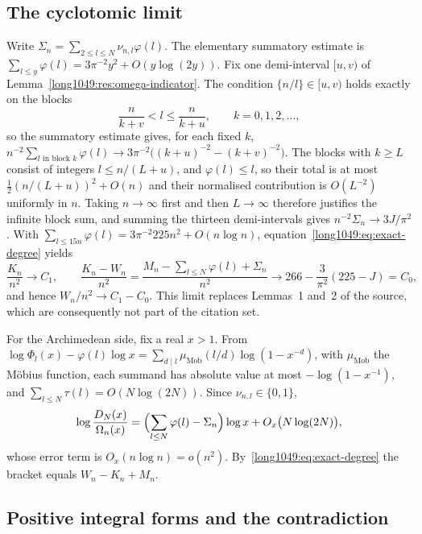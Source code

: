 \documentclass[11pt]{article}
\begin{document}
\subsection{The cyclotomic limit}\label{long1049:sec:cyclotomic-limit}

Write $\Sigma_n=\sum_{2\le l\le N}\nu_{n,l}\varphi(l)$.  The elementary
summatory estimate is $\sum_{l\le y}\varphi(l)=3\pi^{-2}y^{2}+O(y\log(2y))$.
Fix one demi-interval $[u,v)$ of Lemma~\ref{long1049:res:omega-indicator}.  The condition
$\{n/l\}\in[u,v)$ holds exactly on the blocks
\[
 \frac{n}{k+v}<l\le\frac{n}{k+u},\qquad k=0,1,2,\dots,
\]
so the summatory estimate gives, for each fixed $k$,
$n^{-2}\sum_{l\text{ in block }k}\varphi(l)\to3\pi^{-2}\bigl((k+u)^{-2}-(k+v)^{-2}\bigr)$.
The blocks with $k\ge L$ consist of integers $l\le n/(L+u)$, and
$\varphi(l)\le l$, so their total is at most $\tfrac12(n/(L+u))^{2}+O(n)$ and
their normalised contribution is $O(L^{-2})$ uniformly in $n$.  Taking
$n\to\infty$ first and then $L\to\infty$ therefore justifies the infinite block
sum, and summing the thirteen demi-intervals gives
$n^{-2}\Sigma_n\to3J/\pi^{2}$.  With $\sum_{l\le15n}\varphi(l)=3\pi^{-2}225n^{2}+O(n\log n)$,
equation~\eqref{long1049:eq:exact-degree} yields
\begin{equation}\label{long1049:eq:degree-limits}
 \frac{K_n}{n^{2}}\to C_1,
 \qquad
 \frac{K_n-W_n}{n^{2}}=\frac{M_n-\sum_{l\le N}\varphi(l)+\Sigma_n}{n^{2}}
 \to266-\frac{3}{\pi^{2}}(225-J)=C_0,
\end{equation}
and hence $W_n/n^{2}\to C_1-C_0$.  This limit replaces Lemmas~1 and~2 of the
source, which are consequently not part of the citation set.

For the Archimedean side, fix a real $x>1$.  From
$\log\Phi_l(x)-\varphi(l)\log x=\sum_{d\mid l}\mu_{\mathrm{Mob}}(l/d)\log(1-x^{-d})$,
with $\mu_{\mathrm{Mob}}$ the M\"obius function, each summand has absolute value
at most $-\log(1-x^{-1})$, and $\sum_{l\le N}\tau(l)=O(N\log(2N))$.  Since
$\nu_{n,l}\in\{0,1\}$,
\begin{equation}\label{long1049:eq:cyclotomic-size}
 \log\frac{D_N(x)}{\Omega_n(x)}
 =\Bigl(\sum_{l\le N}\varphi(l)-\Sigma_n\Bigr)\log x+O_x\bigl(N\log(2N)\bigr),
\end{equation}
whose error term is $O_x(n\log n)=o(n^{2})$.  By~\eqref{long1049:eq:exact-degree} the
bracket equals $W_n-K_n+M_n$.

\subsection{Positive integral forms and the
contradiction}\label{long1049:sec:integer-forms}
\end{document}
